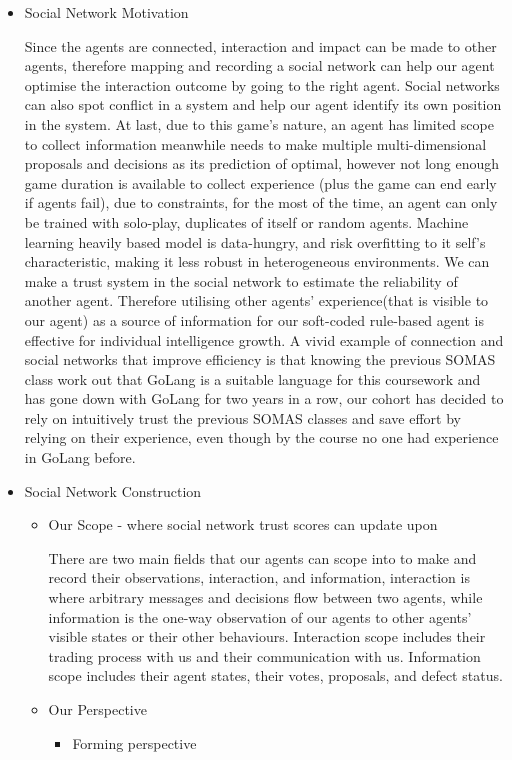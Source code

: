 \begin{itemize}
    \item Social Network Motivation
          \begin{flushleft}
              \setlength{\parindent}{2em}
              Since the agents are connected, interaction and impact can be made to other agents, therefore mapping and recording a social network can help our agent optimise the interaction outcome by going to the right agent. Social networks can also spot conflict in a system and help our agent identify its own position in the system. At last, due to this game's nature, an agent has limited scope to collect information meanwhile needs to make multiple multi-dimensional proposals and decisions as its prediction of optimal, however not long enough game duration is available to collect experience (plus the game can end early if agents fail), due to constraints, for the most of the time, an agent can only be trained with solo-play, duplicates of itself or random agents. Machine learning heavily based model is data-hungry, and risk overfitting to it self's characteristic, making it less robust in heterogeneous environments. We can make a trust system in the social network to estimate the reliability of another agent. Therefore utilising other agents' experience(that is visible to our agent) as a source of information for our soft-coded rule-based agent is effective for individual intelligence growth. A vivid example of connection and social networks that improve efficiency is that knowing the previous SOMAS class work out that GoLang is a suitable language for this coursework and has gone down with GoLang for two years in a row, our cohort has decided to rely on intuitively trust the previous SOMAS classes and save effort by relying on their experience, even though by the course no one had experience in GoLang before.

          \end{flushleft}
    \item Social Network Construction
          \begin{itemize}
              \item  Our Scope - where social network trust scores can update upon

                    There are two main fields that our agents can scope into to make and record their observations, interaction, and information, interaction is where arbitrary messages and decisions flow between two agents, while information is the one-way observation of our agents to other agents' visible states or their other behaviours. Interaction scope includes their trading process with us and their communication with us. Information scope includes their agent states, their votes, proposals, and defect status.
              \item Our Perspective
                    \begin{itemize}
                        \item Forming perspective


\end{itemize}
\end{itemize}
\end{itemize}
